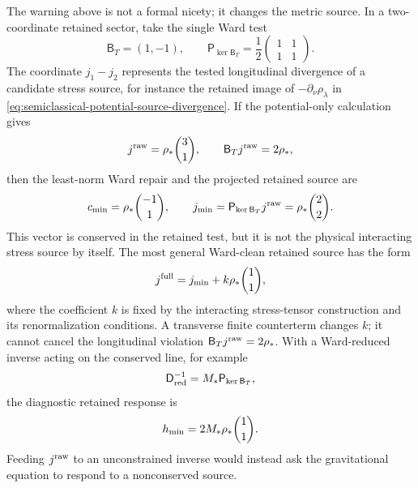 \begin{example}
\label{ex:semiclassical-retained-ward-completion-laboratory}
The warning above is not a formal nicety; it changes the metric source.  In a
two-coordinate retained sector, take the single Ward test
\[
  \mathsf B_T=(1,-1),
  \qquad
  \mathsf P_{\ker\mathsf B_T}
  =
  \frac12
  \begin{pmatrix}
    1&1\\
    1&1
  \end{pmatrix}.
\]
The coordinate \(j_1-j_2\) represents the tested longitudinal divergence of a
candidate stress source, for instance the retained image of
\(-\partial_\nu\rho_\lambda\) in
\eqref{eq:semiclassical-potential-source-divergence}.  If the potential-only
calculation gives
\[
  j^{\rm raw}
  =
  \rho_*
  \binom{3}{1},
  \qquad
  \mathsf B_T j^{\rm raw}=2\rho_*,
\]
then the least-norm Ward repair and the projected retained source are
\begin{equation}
  c_{\rm min}
  =
  \rho_*
  \binom{-1}{1},
  \qquad
  j_{\rm min}
  =
  \mathsf P_{\ker\mathsf B_T}j^{\rm raw}
  =
  \rho_*
  \binom{2}{2}.
  \label{eq:semiclassical-finite-ward-laboratory-source}
\end{equation}
This vector is conserved in the retained test, but it is not the physical
interacting stress source by itself.  The most general Ward-clean retained
source has the form
\[
  j^{\rm full}
  =
  j_{\rm min}
  +
  k\rho_*
  \binom{1}{1},
\]
where the coefficient \(k\) is fixed by the interacting stress-tensor
construction and its renormalization conditions.  A transverse finite
counterterm changes \(k\); it cannot cancel the longitudinal violation
\(\mathsf B_T j^{\rm raw}=2\rho_*\).  With a Ward-reduced inverse acting on the
conserved line, for example
\[
  \mathsf D^{-1}_{\rm red}
  =
  M_*
  \mathsf P_{\ker\mathsf B_T},
\]
the diagnostic retained response is
\[
  h_{\rm min}
  =
  2M_*\rho_*
  \binom{1}{1}.
\]
Feeding \(j^{\rm raw}\) to an unconstrained inverse would instead ask the
gravitational equation to respond to a nonconserved source.


\end{example}
